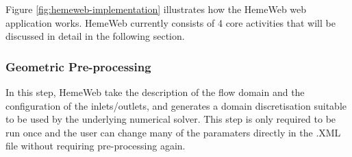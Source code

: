 \noindent%
\begin{minipage}{\linewidth}%
\label{fig:hemeweb-implementation}%
\end{minipage}

\vspace{1cm}

Figure \ref{fig:hemeweb-implementation} illustrates how the HemeWeb web application works. HemeWeb currently consists of 4 core activities that will be discussed in detail in the following section.

\subsubsection{Geometric Pre-processing}

In this step, HemeWeb take the description of the flow domain and the configuration of the inlets/outlets, and generates a domain discretisation suitable to be used by the underlying numerical solver.  This step is only required to be run once and the user can change many of the paramaters directly in the .XML file without requiring pre-processing again. 



\vspace{1cm}

\noindent%
\begin{minipage}{\linewidth}%
\label{fig:hemeweb-pre-processing}%
\end{minipage}

